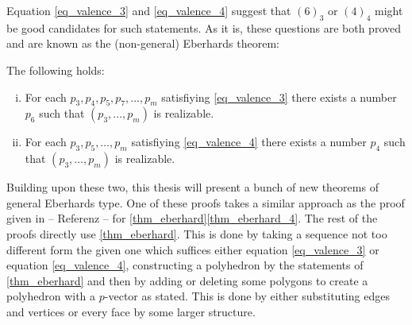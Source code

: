 Equation \ref{eq_valence_3} and \ref{eq_valence_4} suggest that $(6)_3$ or $(4)_4$ might be good candidates for such statements. As it is, these questions are both proved and are known as the (non-general) Eberhards theorem:

\begin{theorem} \label{thm_eberhard} The following holds:
  \begin{enumerate}[(i)]
  \item For each $p_3, p_4, p_5, p_7, \dots, p_m$ satisfiying \ref{eq_valence_3} there exists a number $p_6$ such that $(p_3, \dots, p_m)$ is realizable. \label{thm_eberhard_3}
  \item For each $p_3, p_5, \dots, p_m$ satisfiying \ref{eq_valence_4} there exists a number $p_4$ such that $(p_3, \dots, p_m)$ is realizable. \label{thm_eberhard_4}
  \end{enumerate}
\end{theorem}

Building upon these two, this thesis will present a bunch of new theorems of general Eberhards type. One of these proofs takes a similar approach as the proof given in -- Referenz -- for \ref{thm_eberhard}\ref{thm_eberhard_4}. The rest of the proofs directly use \ref{thm_eberhard}. This is done by taking a sequence not too different form the given one which suffices either equation \ref{eq_valence_3} or equation \ref{eq_valence_4}, constructing a polyhedron by the statements of \ref{thm_eberhard} and then by adding or deleting some polygons to create a polyhedron with a $p$-vector as stated. This is done by either substituting edges and vertices or every face by some larger structure. 



